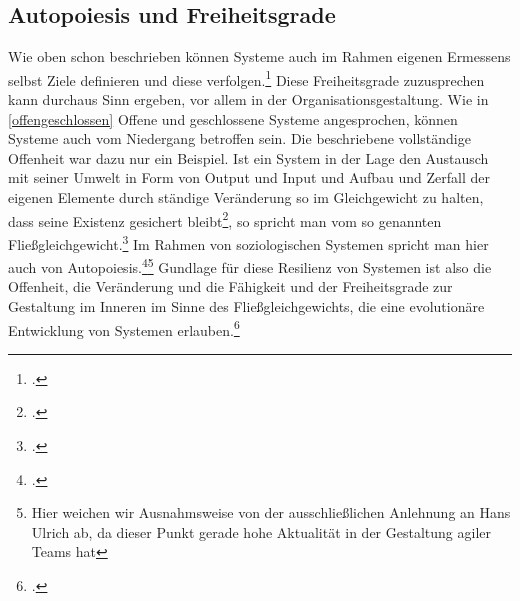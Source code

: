 \documentclass[a4paper,12pt]{article}
\begin{document}
\subsection{Autopoiesis und Freiheitsgrade}\label{selbsterhalt}
Wie oben schon beschrieben können Systeme auch im Rahmen eigenen Ermessens selbst Ziele definieren und diese verfolgen.\footcite[S. 114]{Ulrich1968} Diese Freiheitsgrade zuzusprechen kann durchaus Sinn ergeben, vor allem in der Organisationsgestaltung. Wie in \ref{offengeschlossen} Offene und geschlossene Systeme angesprochen, können Systeme auch vom Niedergang betroffen sein. Die beschriebene vollständige Offenheit war dazu nur ein Beispiel. Ist ein System in der Lage den Austausch mit seiner Umwelt in Form von Output und Input und Aufbau und Zerfall der eigenen Elemente durch ständige Veränderung so im Gleichgewicht zu halten, dass seine Existenz gesichert bleibt\footcite[S. 113]{Ulrich1968}, so spricht man vom so genannten Fließgleichgewicht.\footcite[86]{Diesner2015} Im Rahmen von soziologischen Systemen spricht man hier auch von Autopoiesis.\footcite[S. 63]{Willke2006}\footnote{Hier weichen wir Ausnahmsweise von der ausschließlichen Anlehnung an Hans Ulrich ab, da dieser Punkt gerade hohe Aktualität in der Gestaltung agiler Teams hat} Gundlage für diese Resilienz von Systemen ist also die Offenheit, die Veränderung und die Fähigkeit und der Freiheitsgrade zur Gestaltung im Inneren im Sinne des Fließgleichgewichts, die eine evolutionäre Entwicklung von Systemen erlauben.\footcite[144]{Malik2009}
 
\end{document}
